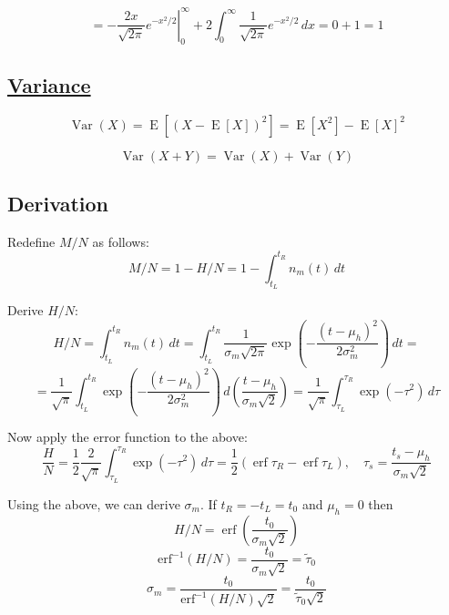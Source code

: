 \documentclass[12pt]{article}
\begin{document}
\[
= \left. -\frac{2x}{\sqrt{2\pi}} e^{-x^2/2} \right|_0^\infty +
2 \int_{0}^{\infty} \frac{1}{\sqrt{2\pi}} e^{-x^2/2} \,dx = 0 + 1 = 1
\]

\subsection*{\href{https://en.wikipedia.org/wiki/Variance}{Variance}}

\begin{equation}
\operatorname{Var} (X) = \operatorname {E} \left[(X-\operatorname {E} [X])^{2}\right] = \operatorname {E} \left[X^{2}\right]-\operatorname {E} [X]^{2}
\label{eq:def_Variance}
\end{equation}

\begin{equation}
\operatorname {Var} (X+Y)=\operatorname {Var} (X)+\operatorname {Var} (Y)
\label{eq:def_Variance_sum}
\end{equation}

\pagebreak

\subsection*{Derivation}

Redefine \( M / N \) as follows:
\begin{equation}
M / N = 1 - H / N = 1 - \int_{t_L}^{t_R} n_m(t) \,dt
\end{equation}

Derive \( H / N \):
\[
H / N = \int_{t_L}^{t_R} n_m(t) \,dt =
\int_{t_L}^{t_R} \frac{1}{\sigma_m\sqrt{2\pi}} \exp\left(-\frac{(t - \mu_h)^2}{2\sigma_m^2} \right) \,dt =
\]
\[
= \frac{1}{\sqrt{\pi}} \int_{t_L}^{t_R} \exp\left(-\frac{(t - \mu_h)^2}{2\sigma_m^2} \right) \,d\left(\frac{t - \mu_h}{\sigma_m\sqrt{2}}\right) =
\frac{1}{\sqrt{\pi}} \int_{\tau_L}^{\tau_R} \exp\left(-\tau^2 \right) \,d\tau
\]

Now apply the error function to the above:
\[
\frac{H}{N} = \frac{1}{2}\frac{2}{\sqrt{\pi}} \int_{\tau_L}^{\tau_R} \exp\left(-\tau^2 \right) \,d\tau =
\frac{1}{2} \left( \operatorname{erf} \tau_R - \operatorname{erf} \tau_L \right) , \quad \tau_s = \frac{t_s - \mu_h}{\sigma_m\sqrt{2}}
\]

Using the above, we can derive \(\sigma_m\). If \(t_R = -t_L = t_0\) and \( \mu_h = 0 \) then
\[
H / N = \operatorname{erf}\left(\frac{t_0}{\sigma_m\sqrt{2}}\right)
\]
\[
\operatorname{erf^{-1}}\left(H / N\right) = \frac{t_0}{\sigma_m\sqrt{2}} = \widetilde{\tau}_0
\]
\[
\sigma_m = \frac{t_0}{\operatorname{erf^{-1}}\left(H / N\right)\sqrt{2}} = \frac{t_0}{\widetilde{\tau}_0\sqrt{2}}
\]
\end{document}
